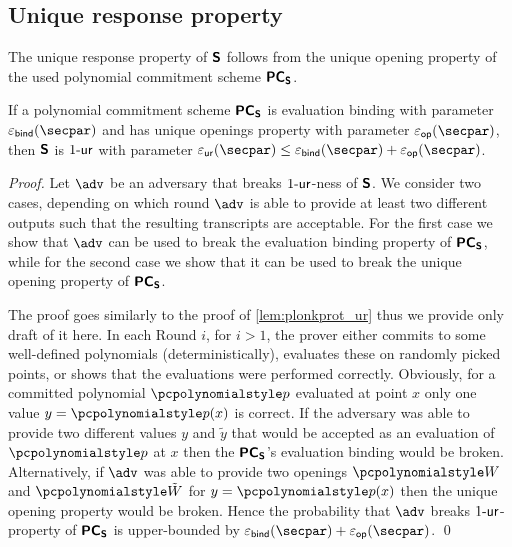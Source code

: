 \subsection{Unique response property}
The unique response property of $\bm{\mathsf{S}}$ follows from the unique opening
property of the used polynomial commitment scheme $\bm{\mathsf{PC}}_{\bm{\mathsf{S}}}$.
\begin{lemma}
\label{lem:sonicprot_ur}
If a polynomial commitment scheme $\bm{\mathsf{PC}}_{\bm{\mathsf{S}}}$ is evaluation binding with
parameter $\epsbind(\secpar)$ and has unique openings property with parameter
$\epsop(\secpar)$, then $\bm{\mathsf{S}}$ is ${1\text{-}\mathsf{ur}}$ with parameter $\epsur(\secpar) \leq
\epsbind(\secpar) + \epsop(\secpar)$.  
\end{lemma}
\begin{proof}
  Let $\adv$ be an adversary that breaks ${1\text{-}\mathsf{ur}}$-ness of $\bm{\mathsf{S}}$.  We
  consider two cases, depending on which round $\adv$ is able to provide at
  least two different outputs such that the resulting transcripts are
  acceptable.  For the first case we show that $\adv$ can be used to break the
  evaluation binding property of $\bm{\mathsf{PC}}_{\bm{\mathsf{S}}}$, while for the second case we show
  that it can be used to break the unique opening property of $\bm{\mathsf{PC}}_{\bm{\mathsf{S}}}$.

  The proof goes similarly to the proof of \cref{lem:plonkprot_ur} thus we
  provide only draft of it here.  In each Round $i$, for $i > 1$, the prover
  either commits to some well-defined polynomials (deterministically), evaluates
  these on randomly picked points, or shows that the evaluations were performed
  correctly.  Obviously, for a committed polynomial $\p{p}$ evaluated at point
  $x$ only one value $y = \p{p}(x)$ is correct. If the adversary was able to
  provide two different values $y$ and $\tilde{y}$ that would be accepted as an
  evaluation of $\p{p}$ at $x$ then the $\bm{\mathsf{PC}}_{\bm{\mathsf{S}}}$'s evaluation binding would be
  broken.  Alternatively, if $\adv$ was able to provide two openings $\p{W}$ and
  $\p{\tilde{W}}$ for $y = \p{p}(x)$ then the unique opening property would be
  broken.
%
Hence the probability that $\adv$ breaks ${1\text{-}\mathsf{ur}}$-property of $\bm{\mathsf{PC}}_{\bm{\mathsf{S}}}$ is
upper-bounded by $\epsbind(\secpar) + \epsop(\secpar)$. 
\qed

\end{proof}

